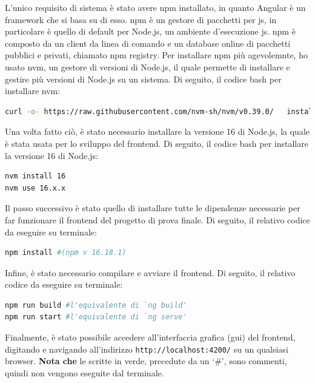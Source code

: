 L'unico requisito di sistema è stato avere \acrfull{npm} installato, in quanto Angular è un framework che si basa su di esso.
\acrshort{npm} è un gestore di pacchetti per \acrshort{js}, in particolare è quello di default per Node.js, un ambiente d'esecuzione \acrshort{js}.
\acrshort{npm} è composto da un client da linea di comando e un database online di pacchetti pubblici e privati, chiamato \acrfull{npm} registry. 
Per installare \acrshort{npm} più agevolemnte, ho usato \acrfull{nvm}, un gestore di versioni di Node.js, il quale permette di installare e gestire più versioni di Node.js su un sistema. Di seguito, il codice bash per installare \acrshort{nvm}: 
\begin{lstlisting}[language=bash, linewidth=20cm, basicstyle=\tiny]
curl -o- https://raw.githubusercontent.com/nvm-sh/nvm/v0.39.0/   install.sh | bash
\end{lstlisting}

Una volta fatto ciò, è stato necessario installare la versione 16 di Node.js, la quale è stata usata per lo sviluppo del frontend. Di seguito, il codice bash per installare la versione 16 di Node.js:
\begin{lstlisting}[language=bash, linewidth=20cm, basicstyle=\tiny]
nvm install 16
nvm use 16.x.x
\end{lstlisting}

Il passo successivo è stato quello di installare tutte le dipendenze necessarie per far funzionare il frontend del progetto di prova finale. Di seguito, il relativo codice da eseguire su terminale:
\begin{lstlisting}[language=bash, linewidth=20cm, basicstyle=\tiny]
npm install #(npm v 16.18.1)
\end{lstlisting}

Infine, è stato necessario compilare e avviare il frontend. Di seguito, il relativo codice da eseguire su terminale:
\begin{lstlisting}[language=bash, linewidth=20cm, basicstyle=\tiny]
npm run build #l'equivalente di `ng build'
npm run start #l'equivalente di `ng serve'
\end{lstlisting}

Finalmente, è stato possibile accedere all'interfaccia grafica (\acrshort{gui}) del frontend, digitando e navigando all'indirizzo \texttt{http://localhost:4200/} su un qualsiasi browser.
\textbf{Nota che } le scritte in verde, precedute da un `\#', sono commenti, quindi non vengono eseguite dal terminale.\newline

